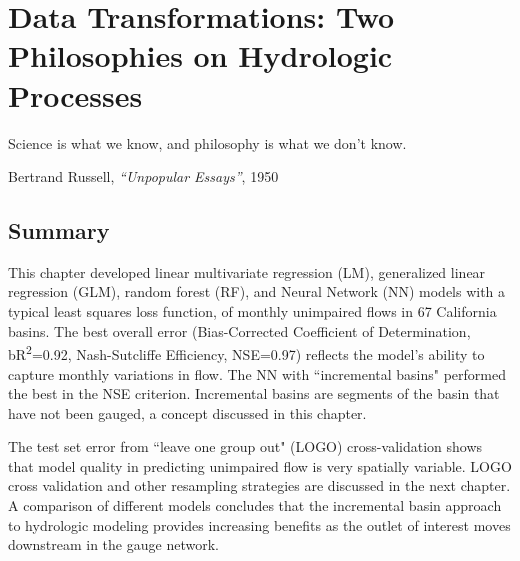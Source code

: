 \chapter[Data Transformations]{Data Transformations: Two Philosophies on Hydrologic Processes} \label{ch2:transformations}
\setlength{\epigraphwidth}{4.5in}
\epigraph{Science is what we know, and philosophy is what we don't know.}{Bertrand Russell, \textit{``Unpopular Essays''}, 1950}

\section*{Summary}
This chapter developed linear multivariate regression (LM), generalized linear regression (GLM), random forest (RF), and Neural Network (NN) models with a typical least squares loss function, of monthly unimpaired flows in 67 California basins. The best overall error (Bias-Corrected Coefficient of Determination, bR\textsuperscript{2}=0.92, Nash-Sutcliffe Efficiency, NSE=0.97) reflects the model's ability to capture monthly variations in flow. The NN with ``incremental basins" performed the best in the NSE criterion. Incremental basins are segments of the basin that have not been gauged, a concept discussed in this chapter. 

The test set error from ``leave one group out" (LOGO) cross-validation shows that model quality in predicting unimpaired flow is very spatially variable. LOGO cross validation and other resampling strategies are discussed in the next chapter. A comparison of different models concludes that the incremental basin approach to hydrologic modeling provides increasing benefits as the outlet of interest moves downstream in the gauge network. 


